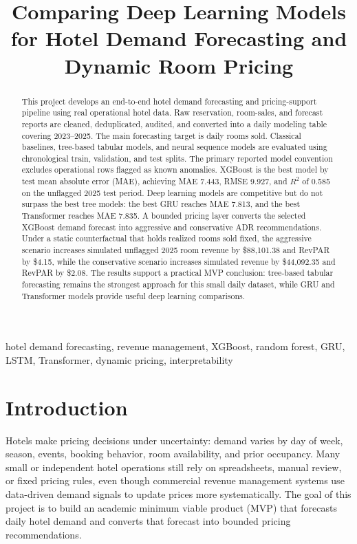 \documentclass[conference]{IEEEtran}
\begin{document}
\title{Comparing Deep Learning Models for Hotel Demand Forecasting and Dynamic Room Pricing}

\author{
}

\maketitle

\begin{abstract}
This project develops an end-to-end hotel demand forecasting and pricing-support pipeline using real operational hotel data. Raw reservation, room-sales, and forecast reports are cleaned, deduplicated, audited, and converted into a daily modeling table covering 2023--2025. The main forecasting target is daily rooms sold. Classical baselines, tree-based tabular models, and neural sequence models are evaluated using chronological train, validation, and test splits. The primary reported model convention excludes operational rows flagged as known anomalies. XGBoost is the best model by test mean absolute error (MAE), achieving MAE 7.443, RMSE 9.927, and $R^2$ of 0.585 on the unflagged 2025 test period. Deep learning models are competitive but do not surpass the best tree models: the best GRU reaches MAE 7.813, and the best Transformer reaches MAE 7.835. A bounded pricing layer converts the selected XGBoost demand forecast into aggressive and conservative ADR recommendations. Under a static counterfactual that holds realized rooms sold fixed, the aggressive scenario increases simulated unflagged 2025 room revenue by \$88,101.38 and RevPAR by \$4.15, while the conservative scenario increases simulated revenue by \$44,092.35 and RevPAR by \$2.08. The results support a practical MVP conclusion: tree-based tabular forecasting remains the strongest approach for this small daily dataset, while GRU and Transformer models provide useful deep learning comparisons.
\end{abstract}

\begin{IEEEkeywords}
hotel demand forecasting, revenue management, XGBoost, random forest, GRU, LSTM, Transformer, dynamic pricing, interpretability
\end{IEEEkeywords}

\section{Introduction}
Hotels make pricing decisions under uncertainty: demand varies by day of week, season, events, booking behavior, room availability, and prior occupancy. Many small or independent hotel operations still rely on spreadsheets, manual review, or fixed pricing rules, even though commercial revenue management systems use data-driven demand signals to update prices more systematically. The goal of this project is to build an academic minimum viable product (MVP) that forecasts daily hotel demand and converts that forecast into bounded pricing recommendations.
\end{document}
